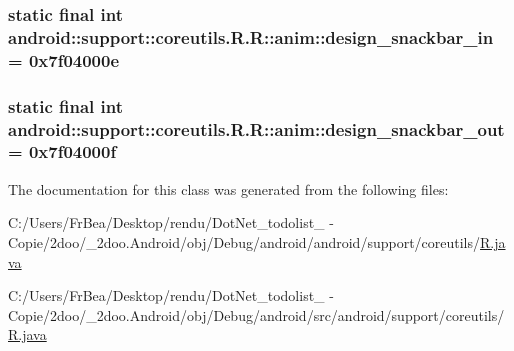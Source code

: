 \hypertarget{classandroid_1_1support_1_1coreutils_1_1_r_1_1anim_74003a1796a5eb1cafc00f13868a75b6}{
\subsubsection[{design\_\-snackbar\_\-in}]{\setlength{\rightskip}{0pt plus 5cm}static final int android::support::coreutils.R.R::anim::design\_\-snackbar\_\-in = 0x7f04000e}}
\label{classandroid_1_1support_1_1coreutils_1_1_r_1_1anim_74003a1796a5eb1cafc00f13868a75b6}


\hypertarget{classandroid_1_1support_1_1coreutils_1_1_r_1_1anim_040d81a644b105b9f2f8dce4b63b7ca5}{
\subsubsection[{design\_\-snackbar\_\-out}]{\setlength{\rightskip}{0pt plus 5cm}static final int android::support::coreutils.R.R::anim::design\_\-snackbar\_\-out = 0x7f04000f}}
\label{classandroid_1_1support_1_1coreutils_1_1_r_1_1anim_040d81a644b105b9f2f8dce4b63b7ca5}




The documentation for this class was generated from the following files:\begin{CompactItemize}
\item 
C:/Users/FrBea/Desktop/rendu/DotNet\_\-todolist\_ - Copie/2doo/\_\-2doo.Android/obj/Debug/android/android/support/coreutils/\hyperlink{android_2support_2coreutils_2_r_8java}{R.java}\item 
C:/Users/FrBea/Desktop/rendu/DotNet\_\-todolist\_ - Copie/2doo/\_\-2doo.Android/obj/Debug/android/src/android/support/coreutils/\hyperlink{src_2android_2support_2coreutils_2_r_8java}{R.java}\end{CompactItemize}
